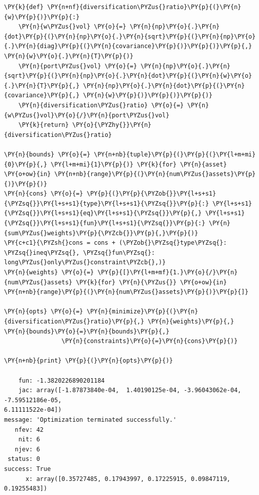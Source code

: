 \begin{tcolorbox}[breakable, size=fbox, boxrule=1pt, pad at break*=1mm,colback=cellbackground, colframe=cellborder]
\begin{Verbatim}[commandchars=\\\{\}]
\PY{k}{def} \PY{n+nf}{diversification\PYZus{}ratio}\PY{p}{(}\PY{n}{w}\PY{p}{)}\PY{p}{:}
    \PY{n}{w\PYZus{}vol} \PY{o}{=} \PY{n}{np}\PY{o}{.}\PY{n}{dot}\PY{p}{(}\PY{n}{np}\PY{o}{.}\PY{n}{sqrt}\PY{p}{(}\PY{n}{np}\PY{o}{.}\PY{n}{diag}\PY{p}{(}\PY{n}{covariance}\PY{p}{)}\PY{p}{)}\PY{p}{,} \PY{n}{w}\PY{o}{.}\PY{n}{T}\PY{p}{)}
    \PY{n}{port\PYZus{}vol} \PY{o}{=} \PY{n}{np}\PY{o}{.}\PY{n}{sqrt}\PY{p}{(}\PY{n}{np}\PY{o}{.}\PY{n}{dot}\PY{p}{(}\PY{n}{w}\PY{o}{.}\PY{n}{T}\PY{p}{,} \PY{n}{np}\PY{o}{.}\PY{n}{dot}\PY{p}{(}\PY{n}{covariance}\PY{p}{,} \PY{n}{w}\PY{p}{)}\PY{p}{)}\PY{p}{)}
    \PY{n}{diversification\PYZus{}ratio} \PY{o}{=} \PY{n}{w\PYZus{}vol}\PY{o}{/}\PY{n}{port\PYZus{}vol}
    \PY{k}{return} \PY{o}{\PYZhy{}}\PY{n}{diversification\PYZus{}ratio}
	
\PY{n}{bounds} \PY{o}{=} \PY{n+nb}{tuple}\PY{p}{(}\PY{p}{(}\PY{l+m+mi}{0}\PY{p}{,} \PY{l+m+mi}{1}\PY{p}{)} \PY{k}{for} \PY{n}{asset} \PY{o+ow}{in} \PY{n+nb}{range}\PY{p}{(}\PY{n}{num\PYZus{}assets}\PY{p}{)}\PY{p}{)}
\PY{n}{cons} \PY{o}{=} \PY{p}{(}\PY{p}{\PYZob{}}\PY{l+s+s1}{\PYZsq{}}\PY{l+s+s1}{type}\PY{l+s+s1}{\PYZsq{}}\PY{p}{:} \PY{l+s+s1}{\PYZsq{}}\PY{l+s+s1}{eq}\PY{l+s+s1}{\PYZsq{}}\PY{p}{,} \PY{l+s+s1}{\PYZsq{}}\PY{l+s+s1}{fun}\PY{l+s+s1}{\PYZsq{}}\PY{p}{:} \PY{n}{sum\PYZus{}weights}\PY{p}{\PYZcb{}}\PY{p}{,}\PY{p}{)}
\PY{c+c1}{\PYZsh{}cons = cons + (\PYZob{}\PYZsq{}type\PYZsq{}: \PYZsq{}ineq\PYZsq{}, \PYZsq{}fun\PYZsq{}:  long\PYZus{}only\PYZus{}constraint\PYZcb{},)}
\PY{n}{weights} \PY{o}{=} \PY{p}{[}\PY{l+m+mf}{1.}\PY{o}{/}\PY{n}{num\PYZus{}assets} \PY{k}{for} \PY{n}{\PYZus{}} \PY{o+ow}{in} \PY{n+nb}{range}\PY{p}{(}\PY{n}{num\PYZus{}assets}\PY{p}{)}\PY{p}{]}
	
\PY{n}{opts} \PY{o}{=} \PY{n}{minimize}\PY{p}{(}\PY{n}{diversification\PYZus{}ratio}\PY{p}{,} \PY{n}{weights}\PY{p}{,} \PY{n}{bounds}\PY{o}{=}\PY{n}{bounds}\PY{p}{,} 
                \PY{n}{constraints}\PY{o}{=}\PY{n}{cons}\PY{p}{)}
	
\PY{n+nb}{print} \PY{p}{(}\PY{n}{opts}\PY{p}{)}

    fun: -1.3820226890201184
    jac: array([-1.87873840e-04,  1.40190125e-04, -3.96043062e-04,
-7.59512186e-05,
6.11111522e-04])
message: 'Optimization terminated successfully.'
   nfev: 42
    nit: 6
   njev: 6
 status: 0
success: True
      x: array([0.35727485, 0.17943997, 0.17225915, 0.09847119, 0.19255483])
\end{Verbatim}
\end{tcolorbox}

